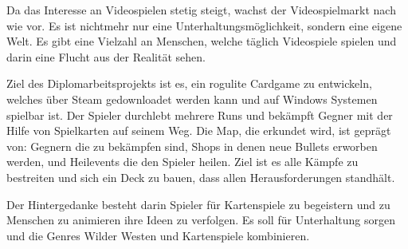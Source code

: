 
%
Da das Interesse an Videospielen stetig steigt, wachst der Videospielmarkt nach wie vor. Es ist nichtmehr nur eine Unterhaltungsmöglichkeit, sondern eine eigene Welt.
Es gibt eine Vielzahl an Menschen, welche täglich Videospiele spielen und darin eine Flucht aus der Realität sehen.

Ziel des Diplomarbeitsprojekts ist es, ein rogulite Cardgame zu entwickeln, welches über Steam gedownloadet werden kann und auf Windows Systemen spielbar ist.
Der Spieler durchlebt mehrere Runs und bekämpft Gegner mit der Hilfe von Spielkarten auf seinem Weg.
Die Map, die erkundet wird, ist geprägt von: Gegnern die zu bekämpfen sind, Shops in denen neue Bullets erworben werden, und Heilevents die den Spieler heilen.
Ziel ist es alle Kämpfe zu bestreiten und sich ein Deck zu bauen, dass allen Herausforderungen standhält.

Der Hintergedanke besteht darin Spieler für Kartenspiele zu begeistern und zu Menschen zu animieren ihre Ideen zu verfolgen. Es soll für Unterhaltung sorgen und die Genres Wilder Westen und Kartenspiele kombinieren.
%


\blindtext[1]
